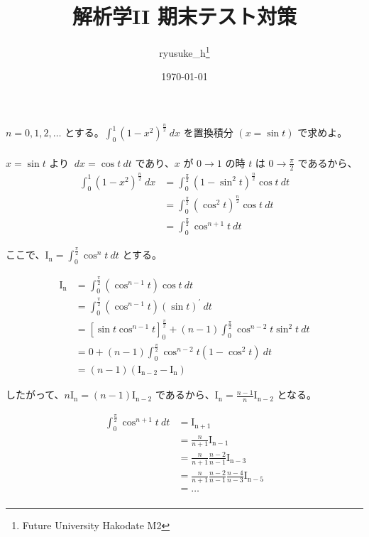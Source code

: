\documentclass[a4j]{jsarticle}
\title{解析学II 期末テスト対策}
\author{ryusuke\_h\thanks{Future University Hakodate M2}}
\date{\today}
\begin{document}
    \maketitle

    $n = 0,1,2,\dots$ とする。$\displaystyle \int_{0}^{1} \left(1 - x^2 \right)^{\frac{n}{2}} \: dx$ を置換積分 $(x = \sin t)$ で求めよ。 \\ \\

    $x = \sin t$ より $\: dx = \cos t \: dt$ であり、$x$ が $0 \rightarrow 1$ の時 $t$ は $\displaystyle 0 \rightarrow \frac{\pi}{2}$ であるから、
    \begin{align*}
        \int_{0}^{1} \left(1 - x^2 \right)^{\frac{n}{2}} \: dx &= \int_{0}^{\frac{\pi}{2}} \left(1 - \sin^2t \right)^{\frac{n}{2}}\cos t \: dt \\
        &= \int_{0}^{\frac{\pi}{2}} \left(\cos^2t \right)^{\frac{n}{2}}\cos t \: dt \\
        &= \int_{0}^{\frac{\pi}{2}} \cos^{n + 1}t \: dt
    \end{align*}

    ここで、$\displaystyle \mathrm{I_n} = \int_{0}^{\frac{\pi}{2}} \cos^n t \: dt$ とする。

    \begin{align*}
        \mathrm{I_n} &= \int_{0}^{\frac{\pi}{2}} \left(\cos^{n - 1} t\right)\cos t \: dt \\
        &= \int_{0}^{\frac{\pi}{2}} \left(\cos^{n - 1} t\right)\left(\sin t\right)^{\prime} \: dt \\
        &= \left[\sin t \cos^{n - 1} t\right]_{0}^{\frac{\pi}{2}} + (n - 1) \int_{0}^{\frac{\pi}{2}} \cos^{n - 2}t \sin^2t \: dt \\
        &= 0 + (n - 1) \int_{0}^{\frac{\pi}{2}} \cos^{n - 2}t \left(1 - \cos^2 t\right) \: dt \\
        &= (n - 1)(\mathrm{I_{n - 2}} - \mathrm{I_n})
    \end{align*}

    したがって、$\displaystyle n \mathrm{I_n} = (n - 1)\mathrm{I_{n - 2}}$ であるから、$\displaystyle \mathrm{I_n} = \frac{n - 1}{n}\mathrm{I_{n - 2}}$ となる。

    \begin{align*}
        \int_{0}^{\frac{\pi}{2}} \cos^{n+1}t\: dt &= \mathrm{I_{n + 1}} \\
        &= \frac{n}{n + 1}\mathrm{I_{n - 1}} \\
        &= \frac{n}{n + 1} \frac{n - 2}{n - 1} \mathrm{I_{n - 3}} \\
        &= \frac{n}{n + 1} \frac{n - 2}{n - 1} \frac{n - 4}{n - 3} \mathrm{I_{n - 5}} \\
        &= \dots \\
    \end{align*}
\end{document}
